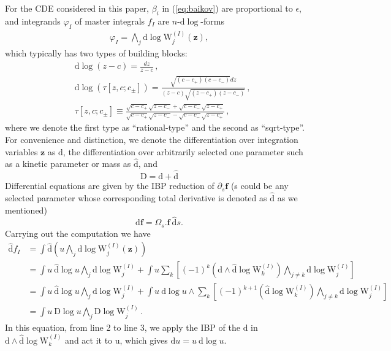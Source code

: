 \documentclass[a4paper,11pt]{article}
\newcommand{\nn}{\nonumber}
\newcommand{\nd}{\mathrm{d}}
\newcommand{\nD}{\mathrm{D}}
\newcommand{\nW}{\mathrm{W}}
\newcommand{\nds}{\hat{\mathrm{d}}}
\def\eref#1{(\ref{#1})}
\begin{document}
For the CDE considered in this paper,  $\beta_i$ in \eref{eq:baikov} 
 are proportional to $\epsilon$, and  integrands $\varphi_I$ of master integrals $f_I$ are $n$-$\nd \log$-forms
\begin{align}
\varphi_I = \bigwedge_{j} \nd \log \nW^{(I)}_j(\bm{z}),
\end{align}
which typically has  two types of building blocks:
\begin{align}
	&\nd \log(z-c) = \frac{d z}{z-c}\,, \nn \\
	&\nd \log(\tau[z,c;c_{\pm}]) = \frac{\sqrt{(c-c_+)(c-c_-)}d z}{(z-c)\sqrt{(z-c_+)(z-c_-)}} \,,\nn\\
	&  \tau[z,c;c_{\pm}]  \equiv \frac{\sqrt{c-c_+} \sqrt{z-c_-}+\sqrt{c-c_-} \sqrt{z-c_+}}{\sqrt{c-c_+}
		\sqrt{z-c_-}-\sqrt{c-c_-} \sqrt{z-c_+}}\,,\label{eq:dlog_basis}
\end{align}
where we denote the  first type as ``rational-type'' and the second as ``sqrt-type''.
For convenience and distinction, we denote the differentiation over integration variables  $\bm{z}$ as $\nd$, the differentiation over  arbitrarily selected one parameter such as a kinetic parameter or mass  as  $\nds$, and
\begin{equation}
\nD = \nd+\nds
\end{equation}
Differential equations are given by the IBP reduction of $\partial_s \bm{f}$ (s could be  any selected parameter whose corresponding total derivative is denoted as $\nds$ as we mentioned)
\begin{equation}
\nds \bm{f} = \Omega_s . \bm{f} ~ \nds s.
\end{equation}
Carrying out the computation we have 
\begin{align}
\nds f_I &= \int \nds \left( u \bigwedge_j \nd \log \nW^{(I)}_j(\bm{z}) \right) \nn\\
&= \int u ~\nds \log u \bigwedge_j \nd \log \nW^{(I)}_j
+ \int u \sum_k \left[  (-1)^k \left(\nd \wedge \nds \log \nW^{(I)}_k \right)\bigwedge_{j\neq k} \nd \log \nW^{(I)}_j \right] \nn\\
&=\int  u ~\nds \log u \bigwedge_j \nd \log \nW^{(I)}_j
+ \int u ~\nd \log u \wedge \sum_k  \left[ (-1)^{k+1} \left( \nds \log \nW^{(I)}_k \right)\bigwedge_{j\neq k} \nd \log \nW^{(I)}_j \right] \nn\\
&=\int u~\nD \log u \bigwedge_j \nD \log \nW^{(I)}_j \,. \label{eq:Dlogvarphi}
\end{align}
In this equation, from line 2 to line 3, we apply the IBP of the $\nd$ in $\nd \wedge \nds \log \nW^{(I)}_k$ and act it to u, which gives $\nd u = u~ \nd \log u$.
\end{document}
